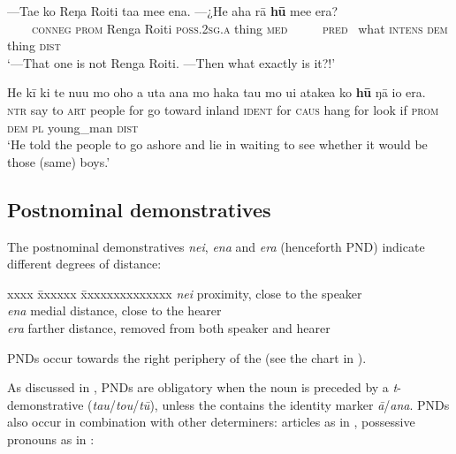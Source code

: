 \ea\label{ex:4.193}
\gll —Ta{\ꞌ}e ko Reŋa Roiti ta{\ꞌ}a me{\ꞌ}e ena. —¿He aha rā  \textbf{hū} me{\ꞌ}e era?\\
~~~~\textsc{conneg} \textsc{prom} Renga Roiti \textsc{poss.2sg.a} thing \textsc{med} ~~~~~\textsc{pred}~ what \textsc{intens}  \textsc{dem} thing \textsc{dist}\\

\glt 
‘—That one is not Renga Roiti. —Then what exactly is it?!’ \textstyleExampleref{[Ley-9-56.092–093]}
\z

\ea\label{ex:4.194}
\gll He kī ki te nu{\ꞌ}u mo oho a {\ꞌ}uta {\ꞌ}ana mo haka tau mo u{\ꞌ}i  {\ꞌ}atakea ko \textbf{hū} ŋā io era.\\
\textsc{ntr} say to \textsc{art} people for go toward inland \textsc{ident} for \textsc{caus} hang for look  if \textsc{prom} \textsc{dem} \textsc{pl} young\_man \textsc{dist}\\

\glt 
‘He told the people to go ashore and lie in waiting to see whether it would be those (same) boys.’ \textstyleExampleref{[R425.011]} 
\z

\subsection{Postnominal demonstratives} \label{sec:4.6.3}
The postnominal demonstratives \textit{nei}, \textit{ena} and \textit{era} (henceforth PND) indicate different degrees of distance:
\begin{tabbing}
xxxx \= xxxxxx \= xxxxxxxxxxxxxx\kill
\> \textit{nei} \>  proximity, close to the speaker\\
\> \textit{ena}\>   medial distance, close to the hearer\\
\> \textit{era} \>  farther distance, removed from both speaker and hearer
\end{tabbing}
PNDs occur towards the right periphery of the  (see the chart in ).

As discussed in , PNDs are obligatory when the noun is preceded by a \textit{t}{}-de\-mon\-stra\-tive (\textit{tau}/\textit{tou}/\textit{tū}), unless the  contains the identity marker \textit{{\ꞌ}ā}/\textit{{\ꞌ}ana}. PNDs also occur in combination with other determiners: articles as in , possessive pronouns as in :

